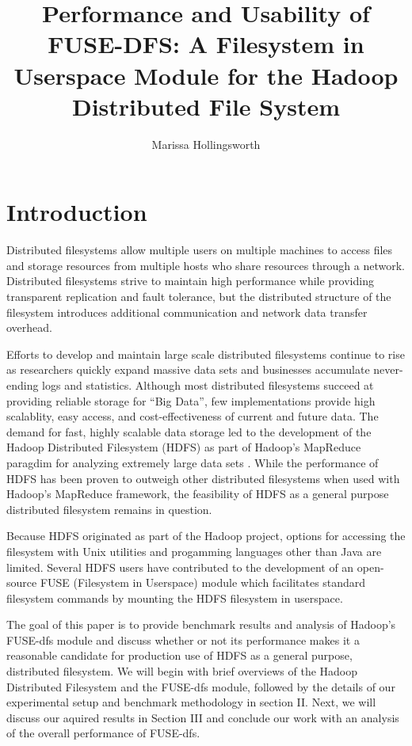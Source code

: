 \documentclass[11]{article}
\author{Marissa Hollingsworth}
\title{Performance and Usability of FUSE-DFS: A Filesystem in Userspace Module for the Hadoop Distributed File System}
\begin{document}
\maketitle

\section{Introduction}
Distributed filesystems allow multiple users on multiple machines to 
access files and storage resources from multiple hosts who share 
resources through a network. Distributed filesystems strive to maintain
high performance while providing transparent replication and fault 
tolerance, but the distributed structure of the filesystem introduces 
additional communication and network data transfer overhead.

Efforts to develop and maintain large scale distributed filesystems  
continue to rise as researchers quickly expand massive data sets 
and businesses accumulate never-ending logs and statistics. Although 
most distributed filesystems succeed at providing reliable storage for 
``Big Data'', few implementations provide high scalablity, easy access, 
and cost-effectiveness of current and future data. The demand for fast, 
highly scalable data storage led to the development of the Hadoop 
Distributed Filesystem (HDFS) as part of Hadoop's  MapReduce paragdim 
for analyzing extremely large data sets \cite{HDFS}. While the 
performance of HDFS has been proven to outweigh other distributed 
filesystems when used with Hadoop's MapReduce framework, the 
feasibility of HDFS as a general purpose distributed filesystem remains 
in question. 

Because HDFS originated as part of the Hadoop project, options for 
accessing the filesystem with Unix utilities and progamming languages 
other than Java are limited. Several HDFS users have contributed to 
the development of an open-source FUSE (Filesystem in Userspace) module 
which facilitates standard filesystem commands by mounting the HDFS 
filesystem in userspace. 

The goal of this paper is to provide benchmark results and analysis of 
Hadoop's FUSE-dfs module and discuss whether or not its performance 
makes it a reasonable candidate for production use of HDFS as a general 
purpose, distributed filesystem. We will begin with brief overviews of 
the Hadoop Distributed Filesystem and the FUSE-dfs module, followed by 
the details of our experimental setup and benchmark methodology in 
section II. Next, we will discuss our aquired results in Section III 
and conclude our work with an analysis of the overall performance of 
FUSE-dfs.
\end{document}
